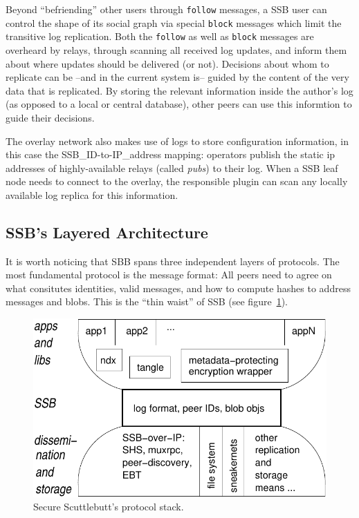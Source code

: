 \documentclass[10pt,sigconf,rewiew]{acmart}
\begin{document}
Beyond ``befriending'' other users through {\tt follow} messages, a SSB user can control the shape of its social graph via special {\tt block} messages which limit the transitive log replication. Both the {\tt follow} as well as {\tt block} messages are overheard by relays, through scanning all received log updates, and inform them about where updates should be delivered (or not). Decisions about whom to replicate can be --and in the current system is-- guided by the content of the very data that is replicated. By storing the relevant information inside the author's log (as opposed to a local or central database), other peers can use this informtion to guide their decisions.

The overlay network also makes use of logs to store configuration information, in this case the SSB\_ID-to-IP\_address mapping: operators publish the static ip addresses of highly-available relays (called {\em pubs}) to their log. When a SSB leaf node needs to connect to the overlay, the responsible plugin can scan any locally available log replica for this information.

\subsection*{SSB's Layered Architecture}

It is worth noticing that SBB spans three independent layers of protocols. The most fundamental protocol is the message format: All peers need to agree on what consitutes identities, valid messages, and how to compute hashes to address messages and blobs. This is the ``thin waist'' of SSB (see figure~\ref{fig:waist}).

\begin{figure}[htb]
  \includegraphics[width=0.9\columnwidth]{figs/ssb-waist.pdf}
  \caption{Secure Scuttlebutt's protocol stack.}
  \label{fig:waist}
\end{figure}
\end{document}
